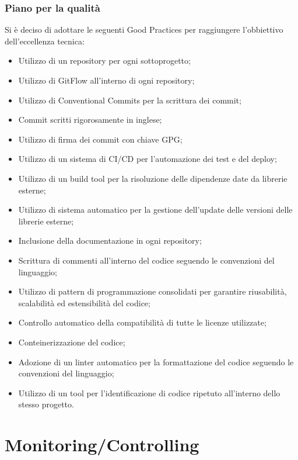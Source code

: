 \documentclass{article}
\begin{document}
  \subsubsection{Piano per la qualità}
  Si è deciso di adottare le seguenti Good Practices per raggiungere l'obbiettivo dell'eccellenza tecnica:
  \begin{itemize}
    \item Utilizzo di un repository per ogni sottoprogetto;
    \item Utilizzo di GitFlow all'interno di ogni repository;
    \item Utilizzo di Conventional Commits per la scrittura dei commit;
    \item Commit scritti rigorosamente in inglese;
    \item Utilizzo di firma dei commit con chiave GPG;
    \item Utilizzo di un sistema di CI/CD per l'automazione dei test e del deploy;
    \item Utilizzo di un build tool per la risoluzione delle dipendenze date da librerie esterne;
    \item Utilizzo di sistema automatico per la gestione dell'update delle versioni delle librerie esterne;
    \item Inclusione della documentazione in ogni repository;
    \item Scrittura di commenti all’interno del codice seguendo le convenzioni del linguaggio;
    \item Utilizzo di pattern di programmazione consolidati per garantire riusabilità, scalabilità ed estensibilità
      del codice;
    \item Controllo automatico della compatibilità di tutte le licenze utilizzate;
    \item Conteinerizzazione del codice;
    \item Adozione di un linter automatico per la formattazione del codice seguendo le convenzioni del
      linguaggio;
    \item Utilizzo di un tool per l’identificazione di codice ripetuto all’interno dello stesso progetto.
  \end{itemize}


  \newpage
  \section{Monitoring/Controlling}
\end{document}
